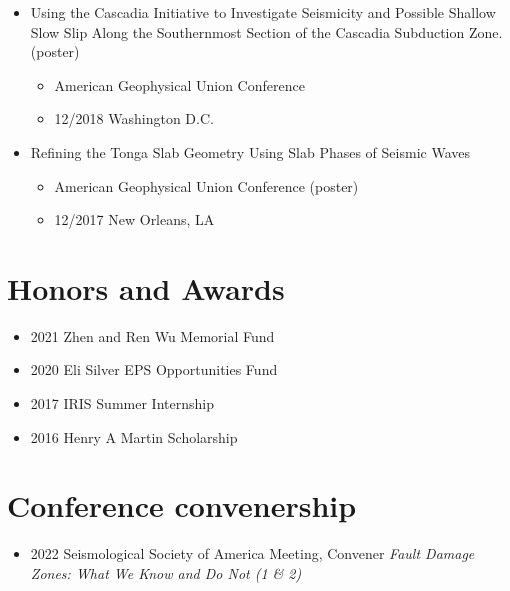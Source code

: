 \documentclass[11pt]{article}
\begin{document}
\begin{itemize}
\item Using the Cascadia Initiative to Investigate Seismicity and Possible Shallow Slow Slip Along the Southernmost Section of the Cascadia Subduction Zone. (poster)
\begin{itemize}
\item American Geophysical Union Conference
\item 12/2018 Washington D.C.
\end{itemize}

\item Refining the Tonga Slab Geometry Using Slab Phases of Seismic Waves
\begin{itemize}
\item American Geophysical Union Conference (poster)
\item 12/2017 New Orleans, LA
\end{itemize}
\end{itemize}

\section{Honors and Awards}
\label{sec:org697a04f}
\begin{itemize}
\item 2021 Zhen and Ren Wu Memorial Fund
\item 2020 Eli Silver EPS Opportunities Fund
\item 2017 IRIS Summer Internship
\item 2016 Henry A Martin Scholarship
\end{itemize}

\section{Conference convenership}
\label{sec:org077ba9f}
\begin{itemize}
\item 2022 Seismological Society of America Meeting, Convener
\emph{Fault Damage Zones: What We Know and Do Not (1 \& 2)}
\end{itemize}
\end{document}
